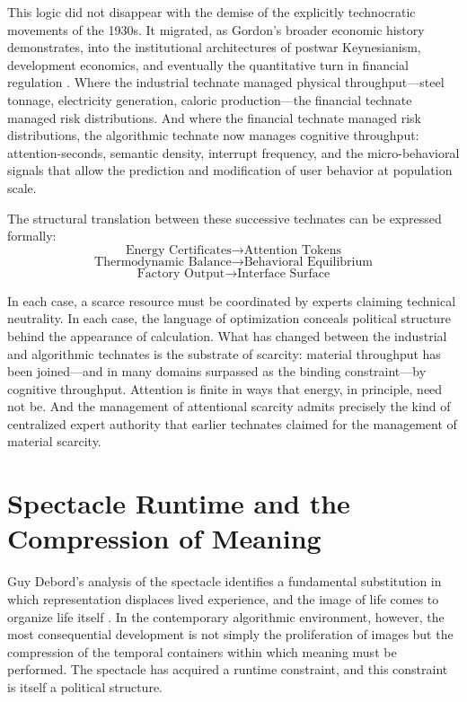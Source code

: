\documentclass[12pt]{article}
\begin{document}
This logic did not disappear with the demise of the explicitly technocratic movements of the 1930s. It migrated, as Gordon's broader economic history demonstrates, into the institutional architectures of postwar Keynesianism, development economics, and eventually the quantitative turn in financial regulation \citep{GordonManyWorlds2023}. Where the industrial technate managed physical throughput---steel tonnage, electricity generation, caloric production---the financial technate managed risk distributions. And where the financial technate managed risk distributions, the algorithmic technate now manages cognitive throughput: attention-seconds, semantic density, interrupt frequency, and the micro-behavioral signals that allow the prediction and modification of user behavior at population scale.

The structural translation between these successive technates can be expressed formally:
\[
\text{Energy Certificates} \rightarrow \text{Attention Tokens}
\]
\[
\text{Thermodynamic Balance} \rightarrow \text{Behavioral Equilibrium}
\]
\[
\text{Factory Output} \rightarrow \text{Interface Surface}
\]

In each case, a scarce resource must be coordinated by experts claiming technical neutrality. In each case, the language of optimization conceals political structure behind the appearance of calculation. What has changed between the industrial and algorithmic technates is the substrate of scarcity: material throughput has been joined---and in many domains surpassed as the binding constraint---by cognitive throughput. Attention is finite in ways that energy, in principle, need not be. And the management of attentional scarcity admits precisely the kind of centralized expert authority that earlier technates claimed for the management of material scarcity.

\section{Spectacle Runtime and the Compression of Meaning}

Guy Debord's analysis of the spectacle identifies a fundamental substitution in which representation displaces lived experience, and the image of life comes to organize life itself \citep{Debord1994}. In the contemporary algorithmic environment, however, the most consequential development is not simply the proliferation of images but the compression of the temporal containers within which meaning must be performed. The spectacle has acquired a runtime constraint, and this constraint is itself a political structure.
\end{document}
